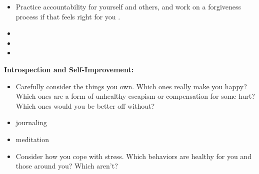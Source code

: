\documentclass[12pt,letterpaper]{book}
\begin{document}
\begin{itemize}
    \item Practice accountability for yourself and others, and work on a forgiveness process if that feels right for you \cite{mingusAccountability,barnardCommunities,gottmanTrust}.  
    \item {}
    \item {} 
    \item {}
\end{itemize}
\noindent \textbf{Introspection and Self-Improvement:} 
\begin{itemize}
    \item Carefully consider the things you own. Which ones really make you happy? Which ones are a form of unhealthy escapism or compensation for some hurt? Which ones would you be better off without? 
    \item journaling
    \item meditation
    \item Consider how you cope with stress. Which behaviors are healthy for you and those around you? Which aren't?
\end{itemize}
\end{document}
